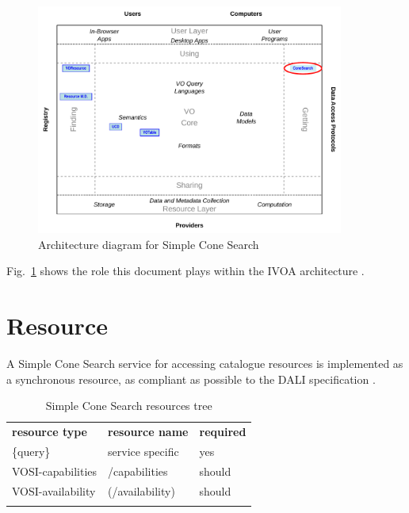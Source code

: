 \documentclass[11pt,a4paper]{ivoa} 
\begin{document}
\begin{figure} \centering


\includegraphics[width=0.9\textwidth]{role_diagram.pdf}
\caption{Architecture diagram for Simple Cone Search}
\label{fig:archdiag} \end{figure}

Fig.~\ref{fig:archdiag} shows the role this document plays within the
IVOA architecture \citep{note:VOARCH}.

\section{Resource} \label{sec:resif}

A Simple Cone Search service for accessing catalogue resources is
implemented as a synchronous resource, as compliant as possible to the
DALI specification \citep{std:DALI}.

\begin{table}[th] \begin{center}
\begin{tabular}{p{}p{}p{}}
\sptablerule \textbf{resource type}&\textbf{resource
name}&\textbf{required}\\ \sptablerule \{query\} & service specific &
yes\\ VOSI-capabilities & /capabilities & should\\ VOSI-availability &
(/availability) & should\\ \sptablerule \label{table:resources}
\end{tabular} \caption{Simple Cone Search resources tree} \end{center}
\end{table}
\end{document}
